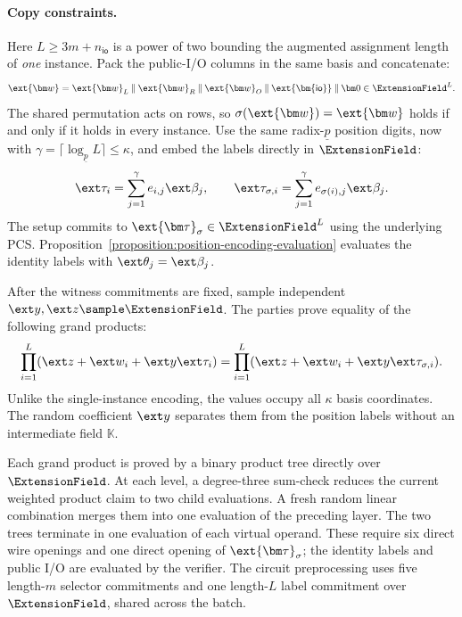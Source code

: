 \paragraph{Copy constraints.}
Here \(L\geq3m+n_{\mathsf{io}}\) is a power of two bounding
the augmented assignment length of \emph{one} instance.
Pack the public-I/O columns in the same basis and concatenate:
\[
    \ext{\bm w}
       =\ext{\bm w}_L\mathbin{\|}\ext{\bm w}_R
          \mathbin{\|}\ext{\bm w}_O
          \mathbin{\|}\ext{\bm{\mathsf{io}}}\mathbin{\|}\bm0
       \in\ExtensionField^L.
\]
The shared permutation acts on rows, so
\(\sigma(\ext{\bm w})=\ext{\bm w}\) holds if and only if it
holds in every instance.
Use the same radix-\(\underline p\) position digits, now with
\(\gamma=\lceil\log_{\underline p}L\rceil\leq\kappa\), and embed
the labels directly in \(\ExtensionField\):
\begin{equation}
    \ext\tau_i=\sum_{j=1}^{\gamma}e_{i,j}\ext\beta_j,
    \qquad
    \ext\tau_{\sigma,i}
       =\sum_{j=1}^{\gamma}e_{\sigma(i),j}\ext\beta_j.
\label{eq:together-multiple-labels}
\end{equation}
The setup commits to \(\ext{\bm\tau}_\sigma\in\ExtensionField^L\)
using the underlying PCS. Proposition~\ref{proposition:position-encoding-evaluation}
evaluates the identity labels with \(\ext\theta_j=\ext\beta_j\).

After the witness commitments are fixed, sample independent
\(\ext y,\ext z\sample\ExtensionField\).
The parties prove equality of the following grand products:
\begin{equation}
    \prod_{i=1}^{L}
       (\ext z+\ext w_i+\ext y\ext\tau_i)
       =
    \prod_{i=1}^{L}
       (\ext z+\ext w_i+\ext y\ext\tau_{\sigma,i}).
\label{eq:together-multiple-copy}
\end{equation}
Unlike the single-instance encoding, the values occupy all
\(\kappa\) basis coordinates. The random coefficient \(\ext y\)
separates them from the position labels without an intermediate
field \(\mathbb K\).

Each grand product is proved by a binary product tree directly
over \(\ExtensionField\). At each level, a degree-three sum-check
reduces the current weighted product claim to two child
evaluations. A fresh random linear combination merges them into
one evaluation of the preceding layer.
The two trees terminate in one evaluation of each virtual operand.
These require six direct wire openings and one direct opening of
\(\ext{\bm\tau}_\sigma\); the identity labels and public I/O
are evaluated by the verifier.
The circuit preprocessing uses five length-\(m\) selector
commitments and one length-\(L\) label commitment over
\(\ExtensionField\), shared across the batch.

